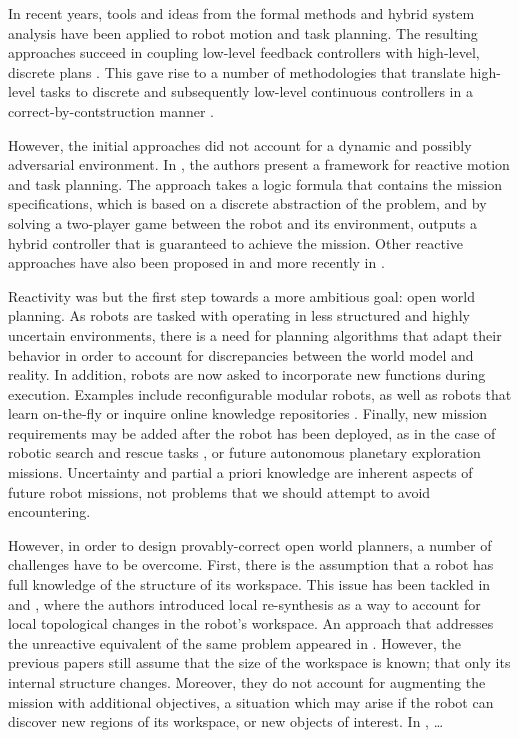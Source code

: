 In recent years, tools and ideas from the formal methods and hybrid system analysis have been applied to robot motion and task planning. The resulting approaches succeed in coupling low-level feedback controllers \cite{} with high-level, discrete plans \cite{}. This gave rise to a number of methodologies that translate high-level tasks to discrete and subsequently low-level continuous controllers in a correct-by-contstruction manner \cite{}.

However, the initial approaches did not account for a dynamic and possibly adversarial environment. In \cite{KGFP_TRO09}, the authors present a framework for reactive motion and task planning. The approach takes a logic formula that contains the mission specifications, which is based on a discrete abstraction of the problem, and by solving a two-player game between the robot and its environment, outputs a hybrid controller that is guaranteed to achieve the mission. Other reactive approaches have also been proposed in \cite{Wongpiromsarn2010} and more recently in \cite{Belta2013RSS}.

Reactivity was but the first step towards a more ambitious goal: open world planning. As robots are tasked with operating in less structured and highly uncertain environments, there is a need for planning algorithms that adapt their behavior in order to account for discrepancies between the world model and reality. In addition, robots are now asked to incorporate new functions during execution. Examples include reconfigurable modular robots, as well as robots that learn on-the-fly \cite{SaxenaIJRR2012} or inquire online knowledge repositories \cite{rapyuta2013}. Finally, new mission requirements may be added after the robot has been deployed, as in the case of robotic search and rescue tasks \cite{MatthiasAI2010}, or future autonomous planetary exploration missions. Uncertainty and partial a priori knowledge are inherent aspects of future robot missions, not problems that we should attempt to avoid encountering.

However, in order to design provably-correct open world planners, a number of challenges have to be overcome. First, there is the assumption that a robot has full knowledge of the structure of its workspace. This issue has been tackled in \cite{MurrayICRA2012} and \cite{MurrayICRA2013a}, where the authors introduced local re-synthesis as a way to account for local topological changes in the robot's workspace. An approach that addresses the unreactive equivalent of the same problem appeared in \cite{Dimos2013ICRA}. However, the previous papers still assume that the size of the workspace is known; that only its internal structure changes. Moreover, they do not account for augmenting the mission with additional objectives, a situation which may arise if the robot can discover new regions of its workspace, or new objects of interest. In \cite{BingxinRSS2012}, \ldots

